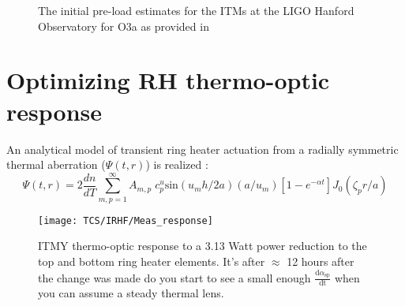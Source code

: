 



\begin{figure*}[!h]
  \centering
  \begin{subfigure}{\texttt{[image: TCS/ITMX\_TCS\_Settings\_tvo.pdf]}}
  \end{subfigure}
  \begin{subfigure}{\texttt{[image: TCS/ITMY\_TCS\_Settings\_tvo.pdf]}}
  \end{subfigure}
  \hfill
  \caption{The initial pre-load estimates for the ITMs at the LIGO Hanford Observatory for O3a as provided in \cite{tvo}} 
  \label{fig:O3_preload_tvo}
\end{figure*}

\section{Optimizing RH thermo-optic response}
An analytical model of transient ring heater actuation from a radially symmetric thermal aberration ($\Psi(t,r)$) is realized \cite{Ramette:16}:
\begin{equation}
	\Psi(t,r)=2\frac{dn}{dT} \sum^{\infty}_{m,p = 1} A_{m,p} \; c^{u}_{p} \mathrm{sin}(u_m h /2a) (a/u_m)[1-e^{-\alpha t}] J_0(\zeta_p r/a)
\end{equation}

\begin{figure}[H]
 \texttt{[image: TCS/IRHF/Meas\_response]}
 \caption{ITMY thermo-optic response to a 3.13 Watt power reduction to the top and bottom ring heater elements. It's after $\approx$ 12 hours after the change was made do you start to see a small enough $\frac{\mathrm{d} \alpha_\mathrm{sp}}{\mathrm{dt}}$ when you can assume a steady thermal lens.}
 \label{fig:meas}
\end{figure}

